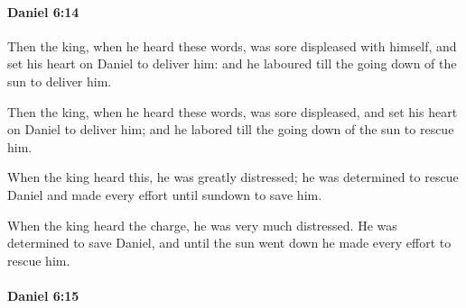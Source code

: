 		\paragraph{Daniel 6:14} %
			\label{DANIEL-6-14}

			Then the king, when he heard these words, was sore displeased with himself, and set his heart on Daniel to deliver him: and he laboured till the going down of the sun to deliver him.

			\begin{versebox}
					\item[BHS] 
					\item[LXX] 
					\item[ASV] Then the king, when he heard these words, was sore displeased, and set his heart on Daniel to deliver him; and he labored till the going down of the sun to rescue him.
					\item[NIV] When the king heard this, he was greatly distressed; he was determined to rescue Daniel and made every effort until sundown to save him.
					\item[NRSV] When the king heard the charge, he was very much distressed. He was determined to save Daniel, and until the sun went down he made every effort to rescue him.
			\end{versebox}

		\paragraph{Daniel 6:15} %
			\label{DANIEL-6-15}

